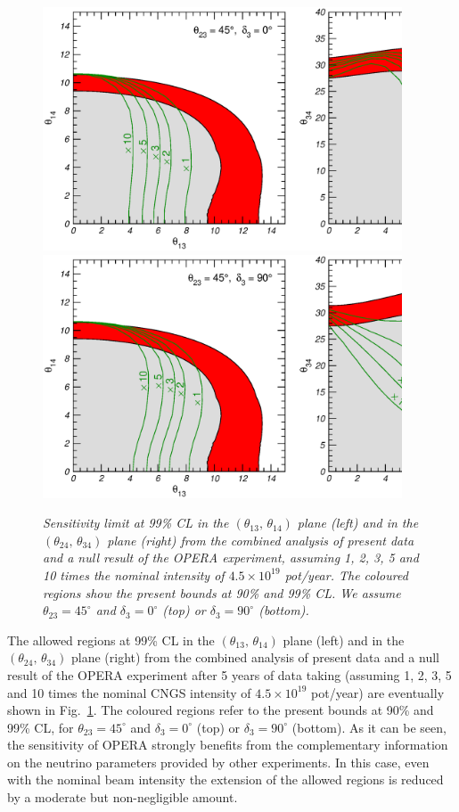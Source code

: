 \documentclass[12pt]{elsart}
\begin{document}
\begin{figure}[t] \centering
    \includegraphics[width=0.95\textwidth]{fig.future-00.eps}
    \includegraphics[width=0.95\textwidth]{fig.future-90.eps}
    \caption{\label{fig:future}\sl%
      Sensitivity limit at 99\% CL in the $(\theta_{13},\,
      \theta_{14})$ plane (left) and in the $(\theta_{24},\,
      \theta_{34})$ plane (right) from the combined analysis of
      present data and a null result of the OPERA experiment, assuming
      1, 2, 3, 5 and 10 times the nominal intensity of $4.5 \times
      10^{19}$ pot/year. The coloured regions show the present bounds
      at 90\% and 99\% CL. We assume $\theta_{23} = 45^\circ$ and
      $\delta_3 = 0^\circ$ (top) or $\delta_3 = 90^\circ$ (bottom).}
\end{figure}

The allowed regions at 99\% CL in the $(\theta_{13},\,\theta_{14})$
plane (left) and in the $(\theta_{24},\,\theta_{34})$ plane (right)
from the combined analysis of present data and a null result of the
OPERA experiment after 5 years of data taking (assuming 1, 2, 3, 5 and
10 times the nominal CNGS intensity of $4.5 \times 10^{19}$ pot/year) 
are eventually shown in Fig.~\ref{fig:future}.  The coloured regions
refer to the present bounds at 90\% and 99\% CL, for $\theta_{23} =
45^\circ$ and $\delta_3 = 0^\circ$ (top) or $\delta_3 = 90^\circ$
(bottom). As it can be seen, the sensitivity of OPERA strongly benefits
from the complementary information on the neutrino parameters provided
by other experiments. In this case, even with the nominal beam
intensity the extension of the allowed regions is reduced by a
moderate but non-negligible amount.
\end{document}
